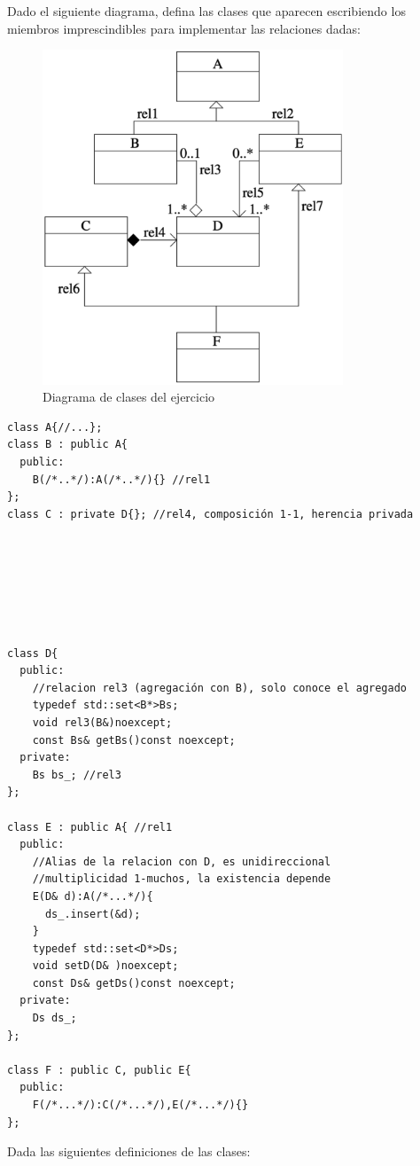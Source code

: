  Dado el siguiente diagrama, defina las clases que aparecen escribiendo los miembros imprescindibles para implementar las relaciones dadas:
\begin{figure}[h]
  \begin{center}
    \includegraphics[width=0.8\textwidth]{assets/Mayo2008_1.png}
  \end{center}
  \caption{Diagrama de clases del ejercicio}
\end{figure}
\begin{verbatim}
class A{//...};
class B : public A{
  public:
    B(/*..*/):A(/*..*/){} //rel1
};
class C : private D{}; //rel4, composición 1-1, herencia privada







class D{
  public:
    //relacion rel3 (agregación con B), solo conoce el agregado
    typedef std::set<B*>Bs;
    void rel3(B&)noexcept;
    const Bs& getBs()const noexcept;
  private:
    Bs bs_; //rel3
};

class E : public A{ //rel1
  public:
    //Alias de la relacion con D, es unidireccional
    //multiplicidad 1-muchos, la existencia depende
    E(D& d):A(/*...*/){
      ds_.insert(&d);
    }
    typedef std::set<D*>Ds;
    void setD(D& )noexcept;
    const Ds& getDs()const noexcept;
  private:
    Ds ds_;
};

class F : public C, public E{
  public:
    F(/*...*/):C(/*...*/),E(/*...*/){}
};
\end{verbatim}
\newpage
{} Dada las siguientes definiciones de las clases:


